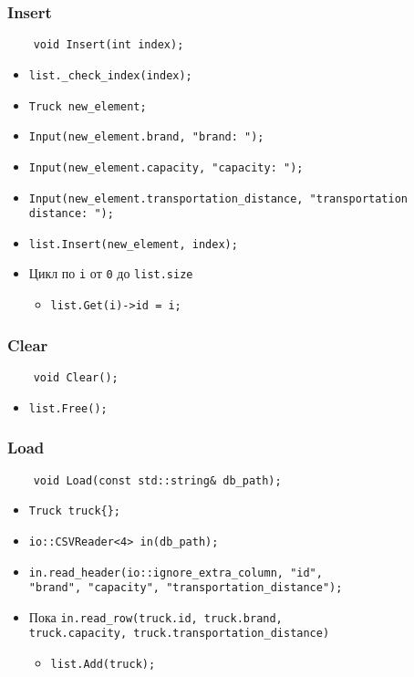 \subsubsection*{Insert}

\begin{lstlisting}
    void Insert(int index);
\end{lstlisting}

\begin{itemize}
	\item \verb|list._check_index(index);|
    \item \verb|Truck new_element;|
    \item \verb|Input(new_element.brand, "brand: ");|
    \item \verb|Input(new_element.capacity, "capacity: ");|
    \item \verb|Input(new_element.transportation_distance, "transportation distance: ");|
	\item \verb|list.Insert(new_element, index);|
	\item Цикл по \verb|i| от \verb|0| до \verb|list.size| 
    \begin{itemize}
        \item \verb|list.Get(i)->id = i;|
    \end{itemize}
\end{itemize}



\subsubsection*{Clear}

\begin{lstlisting}
	void Clear();
\end{lstlisting}

\begin{itemize}
	\item \verb|list.Free();|
\end{itemize}


\subsubsection*{Load}

\begin{lstlisting}
	void Load(const std::string& db_path);
\end{lstlisting}

\begin{itemize}
	\item \verb|Truck truck{};|
	\item \verb|io::CSVReader<4> in(db_path);|
	\item \verb|in.read_header(io::ignore_extra_column, "id",|\\
	\verb|"brand", "capacity", "transportation_distance");|
	\item Пока \verb|in.read_row(truck.id, truck.brand,|\\ 
	\verb|truck.capacity, truck.transportation_distance)|
	\begin{itemize}
		\item \verb|list.Add(truck);|
	\end{itemize}
\end{itemize}


